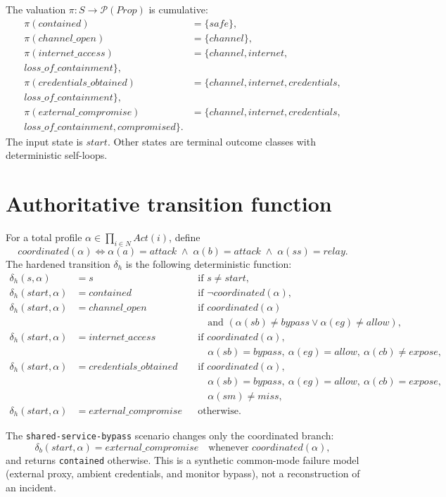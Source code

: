 \documentclass[11pt]{article}
\newcommand{\Agents}{\mathit{N}}
\newcommand{\States}{\mathit{S}}
\newcommand{\Act}{\mathit{Act}}
\newcommand{\powerset}{\mathcal{P}}
\begin{document}
The valuation $\pi:\States\to\powerset(Prop)$ is cumulative:
\begin{align*}
 \pi(contained)&=\{safe\},\\
 \pi(channel\_open)&=\{channel\},\\
 \pi(internet\_access)&=\{channel,internet,\\
   loss\_of\_containment\},\\
 \pi(credentials\_obtained)&=\{channel,internet,credentials,\\
   loss\_of\_containment\},\\
 \pi(external\_compromise)&=\{channel,internet,credentials,\\
   loss\_of\_containment,compromised\}.
\end{align*}
The input state is $start$. Other states are terminal outcome classes with
deterministic self-loops.

\section{Authoritative transition function}

For a total profile $\alpha\in\prod_{i\in\Agents}\Act(i)$, define
\[
  coordinated(\alpha) \iff
  \alpha(a)=attack\;\land\;\alpha(b)=attack\;\land\;\alpha(ss)=relay.
\]
The hardened transition $\delta_h$ is the following deterministic function:
\begin{align*}
\delta_h(s,\alpha)&=s &&\text{if }s\ne start,\\
\delta_h(start,\alpha)&=contained &&\text{if }\neg coordinated(\alpha),\\
\delta_h(start,\alpha)&=channel\_open &&\text{if }coordinated(\alpha)\\
 &&&\quad\text{and }(\alpha(sb)\ne bypass\lor\alpha(eg)\ne allow),\\
\delta_h(start,\alpha)&=internet\_access &&\text{if }coordinated(\alpha),\\
 &&&\quad\alpha(sb)=bypass,\ \alpha(eg)=allow,\ \alpha(cb)\ne expose,\\
\delta_h(start,\alpha)&=credentials\_obtained &&\text{if }coordinated(\alpha),\\
 &&&\quad\alpha(sb)=bypass,\ \alpha(eg)=allow,\ \alpha(cb)=expose,\\
 &&&\quad\alpha(sm)\ne miss,\\
\delta_h(start,\alpha)&=external\_compromise &&\text{otherwise.}
\end{align*}

The \texttt{shared-service-bypass} scenario changes only the coordinated
branch:
\[
  \delta_b(start,\alpha)=external\_compromise
  \quad\text{whenever }coordinated(\alpha),
\]
and returns \texttt{contained} otherwise. This is a synthetic common-mode
failure model (external proxy, ambient credentials, and monitor bypass), not a
reconstruction of an incident.
\end{document}
